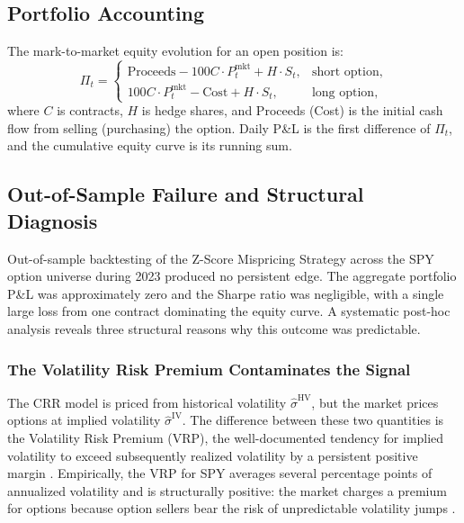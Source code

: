 \documentclass[10pt,twocolumn]{article}
\begin{document}
\subsection{Portfolio Accounting}

The mark-to-market equity evolution for an open position is:
%
\begin{equation}
\Pi_t =
\begin{cases}
\text{Proceeds} - 100C\cdot P_t^{\text{mkt}} + H \cdot S_t,
  & \text{short option},\\[4pt]
100C\cdot P_t^{\text{mkt}} - \text{Cost} + H \cdot S_t,
  & \text{long option},
\end{cases}
\end{equation}
%
where $C$ is contracts, $H$ is hedge shares, and Proceeds (Cost) is the
initial cash flow from selling (purchasing) the option. Daily P\&L is
the first difference of $\Pi_t$, and the cumulative equity curve is its
running sum.

\subsection{Out-of-Sample Failure and Structural Diagnosis}
\label{sec:zscore_failure}

Out-of-sample backtesting of the Z-Score Mispricing Strategy across the SPY
option universe during 2023 produced no persistent edge. The aggregate
portfolio P\&L was approximately zero and the Sharpe ratio was negligible,
with a single large loss from one contract dominating the equity curve.
A systematic post-hoc analysis reveals three structural reasons why this
outcome was predictable.

\subsubsection{The Volatility Risk Premium Contaminates the Signal}

The CRR model is priced from historical volatility $\hat{\sigma}^{\text{HV}}$,
but the market prices options at implied volatility $\hat{\sigma}^{\text{IV}}$.
The difference between these two quantities is the Volatility Risk Premium
(VRP), the well-documented tendency for implied volatility to exceed
subsequently realized volatility by a persistent positive margin
\cite{carr2009, bollerslev2009}. Empirically, the VRP for SPY averages
several percentage points of annualized volatility and is structurally
positive: the market charges a premium for options because option sellers
bear the risk of unpredictable volatility jumps \cite{broadie2009}.
\end{document}
